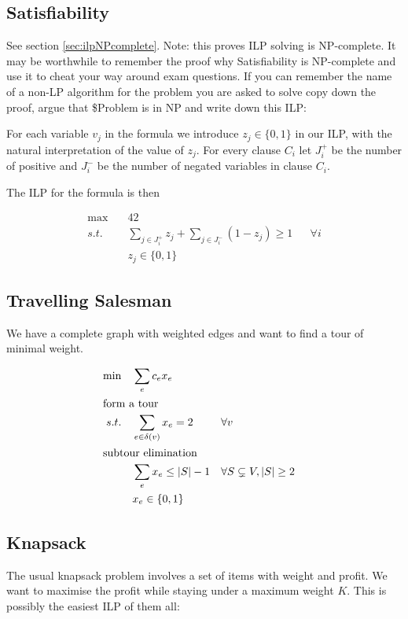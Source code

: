\subsection{Satisfiability}
See section \ref{sec:ilpNPcomplete}. Note: this proves ILP solving is NP-complete. It may be worthwhile to remember the proof why Satisfiability is NP-complete and use it to cheat your way around exam questions. If you can remember the name of a non-LP algorithm for the problem you are asked to solve copy down the proof, argue that \$Problem is in NP and write down this ILP:

For each variable $v_j$ in the formula we introduce $z_j \in \{0,1\}$ in our ILP, with the natural interpretation of the value of $z_j$. For every clause $C_i$ let $J^+_i$ be the number of positive and $J^-_i$ be the number of negated variables in clause $C_i$.

The ILP for the formula is then

\begin{align*}
\max \quad & 42 \\
s.t. &\sum_{j\in J^+_i} z_j + \sum_{j\in J^-_i} (1-z_j) \geq 1 && \forall i\\
&z_j \in \{0,1\}
\end{align*}

\subsection{Travelling Salesman}

We have a complete graph with weighted edges and want to find a tour of minimal weight.

\begin{align*}
\min \quad & \sum_e c_e x_e\\
\intertext{form a tour}
s.t. \quad & \sum_{e\in \delta(v)} x_e = 2 && \forall v\\
\intertext{subtour elimination}
	& \sum_e x_e \leq |S|-1 && \forall S \subsetneq V, |S|\geq 2\\ 
	& x_e \in \{0,1\}
\end{align*}

\subsection{Knapsack}

The usual knapsack problem involves a set of items with weight and profit. We want to maximise the profit while staying under a maximum weight $K$. This is possibly the easiest ILP of them all:

